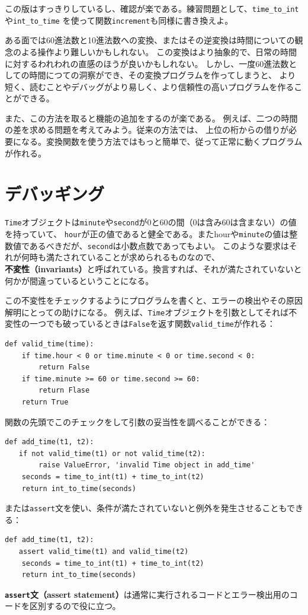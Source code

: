 \documentclass[a4j,12pt,makeidx]{jbook}
\begin{document}
この版はすっきりしているし、確認が楽である。練習問題として、{\tt time\_to\_int}や{\tt int\_to\_time}
を使って関数{\tt increment}も同様に書き換えよ。\par
ある面では60進法数と10進法数への変換、またはその逆変換は時間についての観念のよる操作より難しいかもしれない。
この変換はより抽象的で、日常の時間に対するわれわれの直感のほうが良いかもしれない。
しかし、一度60進法数としての時間につての洞察ができ、その変換プログラムを作ってしまうと、
より短く、読むことやデバッグがより易しく、より信頼性の高いプログラムを作ることができる。\par
また、この方法を取ると機能の追加をするのが楽である。
例えば、二つの時間の差を求める問題を考えてみよう。従来の方法では、
上位の桁からの借りが必要になる。変換関数を使う方法ではもっと簡単で、従って正常に動くプログラムが作れる。
%
\section{デバッギング}
{\tt Time}オブジェクトは{\tt minute}や{\tt second}が0と60の間（0は含み60は含まない）の値を持っていて、
{\tt hour}が正の値であると健全である。またhourや{\tt minute}の値は整数値であるべきだが、{\tt second}は小数点数であってもよい。
このような要求はそれが何時も満たされていることが求められるものなので、
{\bf 不変性（invariants）}と呼ばれている。換言すれば、それが満たされていないと何かが間違っているということになる。\par
この不変性をチェックするようにプログラムを書くと、エラーの検出やその原因解明にとっての助けになる。
例えば、{\tt Time}オブジェクトを引数としてそれば不変性の一つでも破っているときは{\tt False}を返す関数{\tt valid\_time}が作れる：
\begin{verbatim}
def valid_time(time):
    if time.hour < 0 or time.minute < 0 or time.second < 0:
        return False
    if time.minute >= 60 or time.second >= 60:
        return Flase
    return True
\end{verbatim}
関数の先頭でこのチェックをして引数の妥当性を調べることができる：
\begin{verbatim}
def add_time(t1, t2):
　　if not valid_time(t1) or not valid_time(t2):
        raise ValueError, 'invalid Time object in add_time'
    seconds = time_to_int(t1) + time_to_int(t2)
    return int_to_time(seconds)
\end{verbatim}
または{\tt assert}文を使い、条件が満たされていないと例外を発生させることもできる：
\begin{verbatim}
def add_time(t1, t2):
　　assert valid_time(t1) and valid_time(t2)
    seconds = time_to_int(t1) + time_to_int(t2)
    return int_to_time(seconds)
\end{verbatim}
{\bf {\tt assert}文（assert statement）}は通常に実行されるコードとエラー検出用のコードを区別するので役に立つ。
%
\end{document}
